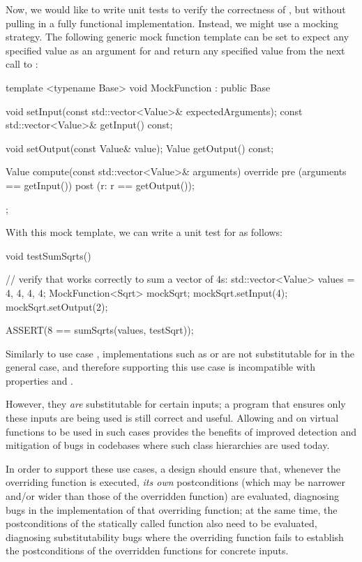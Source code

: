 Now, we would like to write unit tests to verify the correctness of , but without pulling in a fully functional  implementation. Instead, we might use a mocking strategy. The following generic mock function template can be set to expect any specified value as an argument for and return any specified value from the next call to :

\begin{codeblock}
template <typename Base>
void MockFunction : public Base {
  void setInput(const std::vector<Value>& expectedArguments);
  const std::vector<Value>& getInput() const;
  
  void setOutput(const Value& value);
  Value getOutput() const;
  
  Value compute(const std::vector<Value>& arguments) override
    pre (arguments == getInput())
    post (r: r == getOutput());
};
\end{codeblock}

With this mock template, we can write a unit test for  as follows:

\begin{codeblock}
void testSumSqrts() {
  // verify that  works correctly to sum a vector of 4s:
  std::vector<Value> values = {4, 4, 4, 4};
  MockFunction<Sqrt> mockSqrt;
  mockSqrt.setInput({4});
  mockSqrt.setOutput({2});
  
  ASSERT(8 == sumSqrts(values, testSqrt));
}
\end{codeblock}

Similarly to use case , implementations such as  or  are not substitutable for  in the general case, and therefore supporting this use case is incompatible with properties  and .

However, they \emph{are} substitutable for certain inputs; a program that ensures only these inputs are being used is still correct and useful. Allowing  and  on virtual functions to be used in such cases provides the benefits of improved detection and mitigation of bugs in codebases where such class hierarchies are used today.

In order to support these use cases, a design should ensure that, whenever the overriding function is executed, \emph{its own} postconditions (which may be narrower and/or wider than those of the overridden function) are evaluated, diagnosing bugs in the implementation of that overriding function; at the same time, the postconditions of the statically called function also need to be evaluated, diagnosing substitutability bugs where the overriding function fails to establish the postconditions of the overridden functions for concrete inputs.

